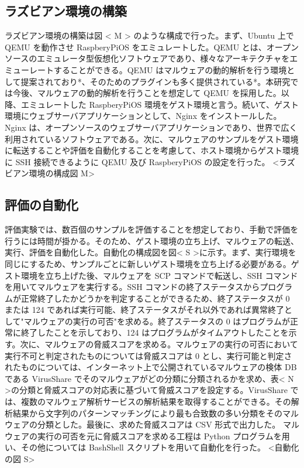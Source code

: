 \documentclass[12pt,a4paper,titlepage,report]{jsbook}
\begin{document}
\subsection{ラズビアン環境の構築}
ラズビアン環境の構築は図 < M > のような構成で行った。まず、Ubuntu 上で QEMU を動作させ RaspberyPiOS をエミュレートした。QEMU とは、オープンソースのエミュレータ型仮想化ソフトウェアであり、様々なアーキテクチャをエミューレートすることができる。QEMU はマルウェアの動的解析を行う環境として提案されており*、そのためのプラグインも多く提供されている*。本研究では今後、マルウェアの動的解析を行うことを想定して QEMU を採用した。以降、エミュレートした RaspberyPiOS 環境をゲスト環境と言う。続いて、ゲスト環境にウェブサーバアプリケーションとして、Nginx をインストールした。Nginx は、オープンソースのウェブサーバアプリケーションであり、世界で広く利用されているソフトウェアである。次に、マルウェアのサンプルをゲスト環境に転送することや評価を自動化することを考慮して、ホスト環境からゲスト環境に SSH 接続できるように QEMU 及び RaspberyPiOS の設定を行った。
<ラズビアン環境の構成図 M>

\subsection{評価の自動化}
評価実験では、数百個のサンプルを評価することを想定しており、手動で評価を行うには時間が掛かる。そのため、ゲスト環境の立ち上げ、マルウェアの転送、実行、評価を自動化した。自動化の構成図を図< S >に示す。まず、実行環境を同じにするため、サンプルごとに新しいゲスト環境を立ち上げる必要がある。ゲスト環境を立ち上げた後、マルウェアを SCP コマンドで転送し、SSH コマンドを用いてマルウェアを実行する。SSH コマンドの終了ステータスからプログラムが正常終了したかどうかを判定することができるため、終了ステータスが 0 または 124 であれば実行可能、終了ステータスがそれ以外であれば異常終了として"マルウェアの実行の可否"を求める。終了ステータスの 0 はプログラムが正常に終了したことを示しており、124 はプログラムがタイムアウトしたことを示す。次に、マルウェアの脅威スコアを求める。マルウェアの実行の可否において実行不可と判定されたものについては脅威スコアは 0 とし、実行可能と判定されたものについては、インターネット上で公開されているマルウェアの検体 DB である VirusShare でそのマルウェアがどの分類に分類されるかを求め、表< N >の分類と脅威スコアの対応表に基づいて脅威スコアを設定する。VirusShare では、複数のマルウェア解析サービスの解析結果を取得することができる。その解析結果から文字列のパターンマッチングにより最も合致数の多い分類をそのマルウェアの分類とした。最後に、求めた脅威スコアは CSV 形式で出力した。
マルウェアの実行の可否を元に脅威スコアを求める工程は Python プログラムを用い、その他については BashShell スクリプトを用いて自動化を行った。
<自動化の図 S>
\end{document}
